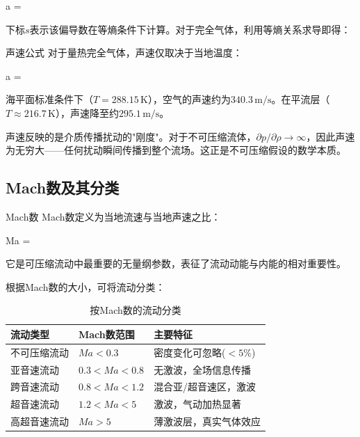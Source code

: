 \begin{myformula}
a = 
\end{myformula}

下标$s$表示该偏导数在等熵条件下计算。对于完全气体，利用等熵关系求导即得：

\begin{myTheorem}{声速公式}
对于量热完全气体，声速仅取决于当地温度：
\begin{myformula}
a = 
\end{myformula}
\end{myTheorem}

海平面标准条件下（$T=288.15\,\mathrm{K}$），空气的声速约为$340.3\,\mathrm{m/s}$。在平流层（$T\approx 216.7\,\mathrm{K}$），声速降至约$295.1\,\mathrm{m/s}$。

\begin{remark}
声速反映的是介质传播扰动的"刚度"。对于不可压缩流体，$\partial p/\partial\rho\to\infty$，因此声速为无穷大——任何扰动瞬间传播到整个流场。这正是不可压缩假设的数学本质。
\end{remark}

\subsection{Mach数及其分类}

\begin{mydefinition}{Mach数}
Mach数定义为当地流速与当地声速之比：
\begin{myformula}
Ma = 
\end{myformula}
它是可压缩流动中最重要的无量纲参数，表征了流动动能与内能的相对重要性。
\end{mydefinition}

根据Mach数的大小，可将流动分类：

\begin{table}[H]
\centering
\caption{按Mach数的流动分类}
\label{tab:mach_class}
\begin{tabular}{lll}
\toprule
\textbf{流动类型} & \textbf{Mach数范围} & \textbf{主要特征} \\
\midrule
不可压缩流动 & $Ma < 0.3$ & 密度变化可忽略($<5\%$) \\
亚音速流动 & $0.3 < Ma < 0.8$ & 无激波，全场信息传播 \\
跨音速流动 & $0.8 < Ma < 1.2$ & 混合亚/超音速区，激波 \\
超音速流动 & $1.2 < Ma < 5$ & 激波，气动加热显著 \\
高超音速流动 & $Ma > 5$ & 薄激波层，真实气体效应 \\
\bottomrule
\end{tabular}
\end{table}

